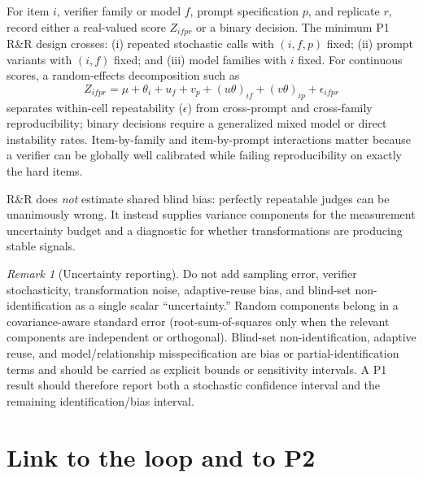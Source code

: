 \documentclass[11pt]{article}
\theoremstyle{definition}
\theoremstyle{remark}
\newtheorem*{remark}{Remark}
\begin{document}
For item $i$, verifier family or model $f$, prompt specification $p$, and replicate $r$, record either a real-valued score $Z_{ifpr}$ or a binary decision. The minimum P1 R\&R design crosses: (i) repeated stochastic calls with $(i,f,p)$ fixed; (ii) prompt variants with $(i,f)$ fixed; and (iii) model families with $i$ fixed. For continuous scores, a random-effects decomposition such as
\[
Z_{ifpr}=\mu+\theta_i+u_f+v_p+(u\theta)_{if}+(v\theta)_{ip}+\epsilon_{ifpr}
\]
separates within-cell repeatability ($\epsilon$) from cross-prompt and cross-family reproducibility; binary decisions require a generalized mixed model or direct instability rates. Item-by-family and item-by-prompt interactions matter because a verifier can be globally well calibrated while failing reproducibility on exactly the hard items.

R\&R does \emph{not} estimate shared blind bias: perfectly repeatable judges can be unanimously wrong. It instead supplies variance components for the measurement uncertainty budget and a diagnostic for whether transformations are producing stable signals.

\begin{remark}[Uncertainty reporting]
Do not add sampling error, verifier stochasticity, transformation noise, adaptive-reuse bias, and blind-set non-identification as a single scalar ``uncertainty.'' Random components belong in a covariance-aware standard error (root-sum-of-squares only when the relevant components are independent or orthogonal). Blind-set non-identification, adaptive reuse, and model/relationship misspecification are bias or partial-identification terms and should be carried as explicit bounds or sensitivity intervals. A P1 result should therefore report both a stochastic confidence interval and the remaining identification/bias interval.
\end{remark}

\section{Link to the loop and to P2}\label{sec:dynamics}
\end{document}
